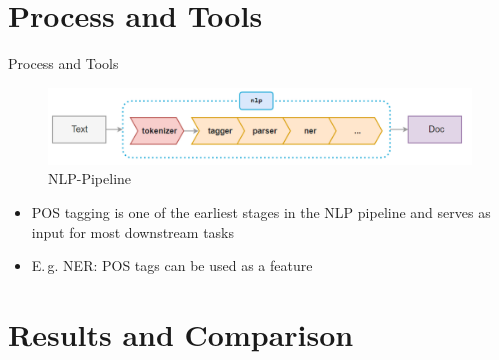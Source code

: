 \section{Process and Tools}

\begin{frame}{Process and Tools}{}
	\begin{figure}
		\includegraphics[scale=0.4]{img/nlp_pipeline}
		\caption{NLP-Pipeline}
	\end{figure}

	\begin{itemize}
		\item POS tagging is one of the earliest stages in the NLP pipeline and serves as input for most
			downstream tasks
		\item E.\,g. NER: POS tags can be used as a feature 
	\end{itemize}
\end{frame}


\section{Results and Comparison}

